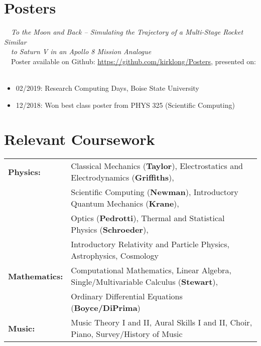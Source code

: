 \documentclass[11pt]{article}
\begin{document}
\section{Posters}
\-\ \-\ \textit{To the Moon and Back -- Simulating the Trajectory of a Multi-Stage Rocket Similar} \\
\-\ \-\ \textit{to Saturn V in an Apollo 8 Mission Analogue}\vspace{1mm}\\
\-\ \-\ Poster available on Github: \url{https://github.com/kirklong/Posters}, presented on:
\-\ \-\ \begin{itemize}[noitemsep]
              \item 02/2019: Research Computing Days, Boise State University
              \item 12/2018: Won best class poster from PHYS 325 (Scientific Computing)
        \end{itemize}

\section{Relevant Coursework}
\begin{tabular}{ll}
\textbf{Physics:} &   Classical Mechanics (\textbf{Taylor}), Electrostatics and Electrodynamics (\textbf{Griffiths}), \\
                  &   Scientific Computing (\textbf{Newman}), Introductory Quantum Mechanics (\textbf{Krane}), \\
                  &   Optics (\textbf{Pedrotti}), Thermal and Statistical Physics (\textbf{Schroeder}),\\
                  &   Introductory Relativity and Particle Physics, Astrophysics, Cosmology \vspace{1mm} \\
\textbf{Mathematics:} &   Computational Mathematics, Linear Algebra, Single/Multivariable Calculus (\textbf{Stewart}),\\
                      &   Ordinary Differential Equations (\textbf{Boyce/DiPrima}) \vspace{1mm} \\
\textbf{Music:}   &   Music Theory I and II, Aural Skills I and II, Choir, Piano, Survey/History of Music \\
\end{tabular}
\end{document}
